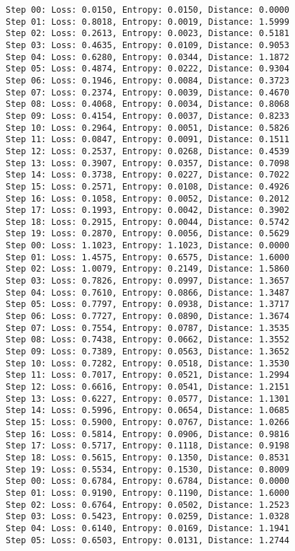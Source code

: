 \documentclass[11pt]{article}
\begin{document}
\begin{Verbatim}[commandchars=\\\{\}]
Step 00: Loss: 0.0150, Entropy: 0.0150, Distance: 0.0000
Step 01: Loss: 0.8018, Entropy: 0.0019, Distance: 1.5999
Step 02: Loss: 0.2613, Entropy: 0.0023, Distance: 0.5181
Step 03: Loss: 0.4635, Entropy: 0.0109, Distance: 0.9053
Step 04: Loss: 0.6280, Entropy: 0.0344, Distance: 1.1872
Step 05: Loss: 0.4874, Entropy: 0.0222, Distance: 0.9304
Step 06: Loss: 0.1946, Entropy: 0.0084, Distance: 0.3723
Step 07: Loss: 0.2374, Entropy: 0.0039, Distance: 0.4670
Step 08: Loss: 0.4068, Entropy: 0.0034, Distance: 0.8068
Step 09: Loss: 0.4154, Entropy: 0.0037, Distance: 0.8233
Step 10: Loss: 0.2964, Entropy: 0.0051, Distance: 0.5826
Step 11: Loss: 0.0847, Entropy: 0.0091, Distance: 0.1511
Step 12: Loss: 0.2537, Entropy: 0.0268, Distance: 0.4539
Step 13: Loss: 0.3907, Entropy: 0.0357, Distance: 0.7098
Step 14: Loss: 0.3738, Entropy: 0.0227, Distance: 0.7022
Step 15: Loss: 0.2571, Entropy: 0.0108, Distance: 0.4926
Step 16: Loss: 0.1058, Entropy: 0.0052, Distance: 0.2012
Step 17: Loss: 0.1993, Entropy: 0.0042, Distance: 0.3902
Step 18: Loss: 0.2915, Entropy: 0.0044, Distance: 0.5742
Step 19: Loss: 0.2870, Entropy: 0.0056, Distance: 0.5629
Step 00: Loss: 1.1023, Entropy: 1.1023, Distance: 0.0000
Step 01: Loss: 1.4575, Entropy: 0.6575, Distance: 1.6000
Step 02: Loss: 1.0079, Entropy: 0.2149, Distance: 1.5860
Step 03: Loss: 0.7826, Entropy: 0.0997, Distance: 1.3657
Step 04: Loss: 0.7610, Entropy: 0.0866, Distance: 1.3487
Step 05: Loss: 0.7797, Entropy: 0.0938, Distance: 1.3717
Step 06: Loss: 0.7727, Entropy: 0.0890, Distance: 1.3674
Step 07: Loss: 0.7554, Entropy: 0.0787, Distance: 1.3535
Step 08: Loss: 0.7438, Entropy: 0.0662, Distance: 1.3552
Step 09: Loss: 0.7389, Entropy: 0.0563, Distance: 1.3652
Step 10: Loss: 0.7282, Entropy: 0.0518, Distance: 1.3530
Step 11: Loss: 0.7017, Entropy: 0.0521, Distance: 1.2994
Step 12: Loss: 0.6616, Entropy: 0.0541, Distance: 1.2151
Step 13: Loss: 0.6227, Entropy: 0.0577, Distance: 1.1301
Step 14: Loss: 0.5996, Entropy: 0.0654, Distance: 1.0685
Step 15: Loss: 0.5900, Entropy: 0.0767, Distance: 1.0266
Step 16: Loss: 0.5814, Entropy: 0.0906, Distance: 0.9816
Step 17: Loss: 0.5717, Entropy: 0.1118, Distance: 0.9198
Step 18: Loss: 0.5615, Entropy: 0.1350, Distance: 0.8531
Step 19: Loss: 0.5534, Entropy: 0.1530, Distance: 0.8009
Step 00: Loss: 0.6784, Entropy: 0.6784, Distance: 0.0000
Step 01: Loss: 0.9190, Entropy: 0.1190, Distance: 1.6000
Step 02: Loss: 0.6764, Entropy: 0.0502, Distance: 1.2523
Step 03: Loss: 0.5423, Entropy: 0.0259, Distance: 1.0328
Step 04: Loss: 0.6140, Entropy: 0.0169, Distance: 1.1941
Step 05: Loss: 0.6503, Entropy: 0.0131, Distance: 1.2744

\end{Verbatim}
\end{document}
